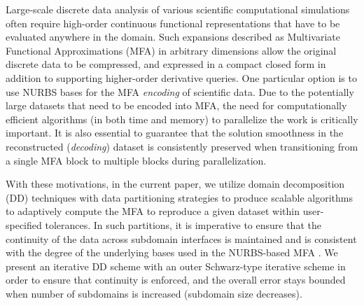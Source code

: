 \documentclass[conference]{IEEEtran}
\newcommand{\Remark}[1]{{\color{RED}\sf Remark: {#1}}}
\begin{document}
Large-scale discrete data analysis of various scientific computational simulations often require high-order continuous functional representations that have to be evaluated anywhere in the domain. Such expansions described as Multivariate Functional Approximations (MFA) \cite{de1983approximation} in arbitrary dimensions allow the original discrete data to be compressed, and expressed in a compact closed form in addition to supporting higher-order derivative queries. One particular option is to use NURBS bases \cite{nurbs-book} for the MFA {\em encoding} of scientific data. Due to the potentially large datasets that need to be encoded into MFA, the need for computationally efficient algorithms (in both time and memory) to parallelize the work is critically important. It is also essential to guarantee that the solution smoothness in the reconstructed ({\em decoding}) dataset is consistently preserved when transitioning from a single MFA block to multiple blocks during parallelization.

With these motivations, in the current paper, we utilize domain decomposition (DD) techniques \cite{smith-ddm} with data partitioning strategies to produce scalable algorithms to adaptively compute the MFA to reproduce a given dataset within user-specified tolerances. In such partitions, it is imperative to ensure that the continuity of the data across subdomain interfaces is maintained and is consistent with the degree of the underlying bases used in the NURBS-based MFA \cite{peterka-mfa}. 
We present an iterative DD scheme with an outer Schwarz-type iterative scheme in order to ensure that continuity is enforced, and the overall error stays bounded when number of subdomains is increased (subdomain size decreases).


\end{document}
